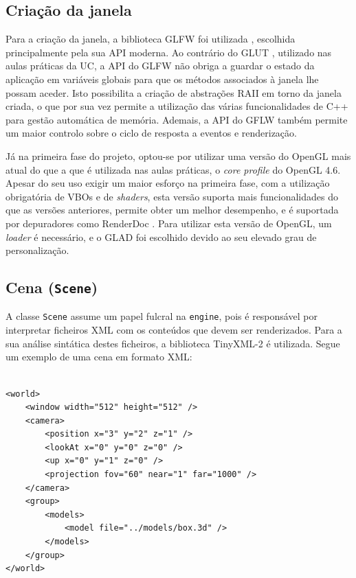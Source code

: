 \documentclass[12pt, a4paper]{article}
\begin{document}
\subsection{Criação da janela}

Para a criação da janela, a biblioteca GLFW foi utilizada \cite{glfw}, escolhida principalmente pela
sua API moderna. Ao contrário do GLUT \cite{glut}, utilizado nas aulas práticas da UC, a API do GLFW
não obriga a guardar o estado da aplicação em variáveis globais para que os métodos associados à
janela lhe possam aceder. Isto possibilita a criação de abstrações RAII em torno da janela criada, o
que por sua vez permite a utilização das várias funcionalidades de C++ para gestão automática de
memória. Ademais, a API do GFLW também permite um maior controlo sobre o ciclo de resposta a eventos
e renderização.

Já na primeira fase do projeto, optou-se por utilizar uma versão do OpenGL mais atual do que a que é
utilizada nas aulas práticas, o \emph{core profile} do OpenGL 4.6. Apesar do seu uso exigir um maior
esforço na primeira fase, com a utilização obrigatória de VBOs e de \emph{shaders}, esta versão
suporta mais funcionalidades do que as versões anteriores, permite obter um melhor desempenho, e é
suportada por depuradores como RenderDoc \cite{renderdoc}. Para utilizar esta versão de OpenGL, um
\emph{loader} é necessário, e o GLAD \cite{glad} foi escolhido devido ao seu elevado grau de
personalização.

\subsection{Cena (\texttt{Scene})}

A classe \texttt{Scene} assume um papel fulcral na \texttt{engine}, pois é responsável por
interpretar ficheiros XML com os conteúdos que devem ser renderizados. Para a sua análise sintática
destes ficheiros, a biblioteca TinyXML-2 \cite{tinyxml2} é utilizada. Segue um exemplo de
uma cena em formato XML:

\lstset{language=xml}
\begin{lstlisting}

<world>
    <window width="512" height="512" />
    <camera>
        <position x="3" y="2" z="1" />
        <lookAt x="0" y="0" z="0" />
        <up x="0" y="1" z="0" />
        <projection fov="60" near="1" far="1000" />
    </camera>
    <group>
        <models>
            <model file="../models/box.3d" />
        </models>
    </group>
</world>
\end{lstlisting}
\end{document}
